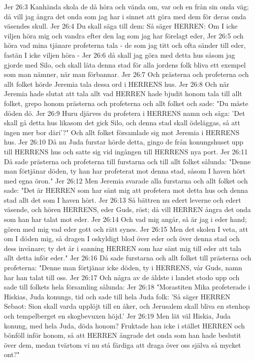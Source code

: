 Jer 26:3  Kanhända skola de då höra och vända om, var och en från sin onda väg; då vill jag ångra det onda som jag har i sinnet att göra med dem för deras onda väsendes skull.
Jer 26:4  Du skall säga till dem: Så säger HERREN: Om I icke viljen höra mig och vandra efter den lag som jag har förelagt eder,
Jer 26:5  och höra vad mina tjänare profeterna tala - de som jag titt och ofta sänder till eder, fastän I icke viljen höra -
Jer 26:6  då skall jag göra med detta hus såsom jag gjorde med Silo, och skall låta denna stad för alla jordens folk bliva ett exempel som man nämner, när man förbannar.
Jer 26:7  Och prästerna och profeterna och allt folket hörde Jeremia tala dessa ord i HERRENS hus.
Jer 26:8  Och när Jeremia hade slutat att tala allt vad HERREN hade bjudit honom tala till allt folket, grepo honom prästerna och profeterna och allt folket och sade: "Du måste döden dö.
Jer 26:9  Huru djärves du profetera i HERRENS namn och säga: 'Det skall gå detta hus likasom det gick Silo, och denna stad skall ödeläggas, så att ingen mer bor däri'?" Och allt folket församlade sig mot Jeremia i HERRENS hus.
Jer 26:10  Då nu Juda furstar hörde detta, gingo de från konungshuset upp till HERRENS hus och satte sig vid ingången till HERRENS nya port.
Jer 26:11  Då sade prästerna och profeterna till furstarna och till allt folket sålunda: "Denne man förtjänar döden, ty han har profeterat mot denna stad, såsom I haven hört med egna öron."
Jer 26:12  Men Jeremia svarade alla furstarna och allt folket och sade: "Det är HERREN som har sänt mig att profetera mot detta hus och denna stad allt det som I haven hört.
Jer 26:13  Så bättren nu edert leverne och edert väsende, och hören HERRENS, eder Guds, röst; då vill HERREN ångra det onda som han har talat mot eder.
Jer 26:14  Och vad mig angår, så är jag i eder hand; gören med mig vad eder gott och rätt synes.
Jer 26:15  Men det skolen I veta, att om I döden mig, så dragen I oskyldigt blod över eder och över denna stad och dess invånare; ty det är i sanning HERREN som har sänt mig till eder att tala allt detta inför eder."
Jer 26:16  Då sade furstarna och allt folket till prästerna och profeterna: "Denne man förtjänar icke döden, ty i HERRENS, vår Guds, namn har han talat till oss.
Jer 26:17  Och några av de äldste i landet stodo upp och sade till folkets hela församling sålunda:
Jer 26:18  "Morastiten Mika profeterade i Hiskias, Juda konungs, tid och sade till hela Juda folk: 'Så säger HERREN Sebaot: Sion skall varda upplöjt till en åker, och Jerusalem skall bliva en stenhop och tempelberget en skogbevuxen höjd.'
Jer 26:19  Men lät väl Hiskia, Juda konung, med hela Juda, döda honom? Fruktade han icke i stället HERREN och bönföll inför honom, så att HERREN ångrade det onda som han hade beslutit över dem, medan tvärtom vi nu stå färdiga att draga över oss själva så mycket ont?"
